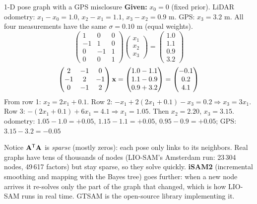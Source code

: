 \begin{worked}{1-D pose graph with a GPS misclosure}
\textbf{Given:} $x_0=0$ (fixed prior). LiDAR odometry: $x_1-x_0=1.0$, $x_2-x_1=1.1$, $x_3-x_2=0.9$ m. GPS: $x_3=3.2$ m. All four measurements have the same $\sigma=0.10$ m (equal weights).
\[ \begin{pmatrix}1&0&0\\-1&1&0\\0&-1&1\\0&0&1\end{pmatrix}\begin{pmatrix}x_1\\x_2\\x_3\end{pmatrix}=\begin{pmatrix}1.0\\1.1\\0.9\\3.2\end{pmatrix} \]
\[ \begin{pmatrix}2&-1&0\\-1&2&-1\\0&-1&2\end{pmatrix}\mathbf{x}=\begin{pmatrix}1.0-1.1\\1.1-0.9\\0.9+3.2\end{pmatrix}=\begin{pmatrix}-0.1\\0.2\\4.1\end{pmatrix} \]
 From row 1: $x_2=2x_1+0.1$. Row 2: $-x_1+2(2x_1+0.1)-x_3=0.2\Rightarrow x_3=3x_1$. Row 3: $-(2x_1+0.1)+6x_1=4.1\Rightarrow x_1=1.05$. Then $x_2=2.20$, $x_3=3.15$.
 odometry: $1.05-1.0=+0.05$, $1.15-1.1=+0.05$, $0.95-0.9=+0.05$; GPS: $3.15-3.2=-0.05$
\end{worked}

\begin{eng}
Notice $\mathbf{A}^{\mathsf T}\mathbf{A}$ is \emph{sparse} (mostly zeros): each pose only links to its neighbors. Real graphs have tens of thousands of nodes (LIO-SAM's Amsterdam run: 23\,304 nodes, 49\,617 factors) but stay sparse, so they solve quickly. \textbf{iSAM2} (incremental smoothing and mapping with the Bayes tree) goes further: when a new node arrives it re-solves only the part of the graph that changed, which is how LIO-SAM runs in real time. GTSAM is the open-source library implementing it.
\end{eng}

